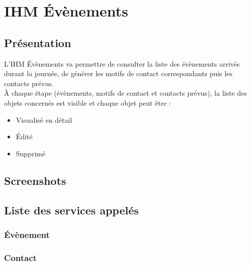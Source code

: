 \section{IHM Évènements}

\subsection{Présentation}

L'IHM Évènements va permettre de consulter la liste des évènements arrivés
durant la journée, de générer les motifs de contact correspondants puis les
contacts prévus.\\

À chaque étape (évènements, motifs de contact et contacts prévus), la liste
des objets concernés est visible et chaque objet peut être :
\begin{itemize}
\item Visualisé en détail
\item Édité
\item Supprimé
\end{itemize}

\subsection{Screenshots}

\subsection{Liste des services appelés}

\subsubsection{Évènement}
\begin{itemize}
\end{itemize}

\subsubsection{Contact}
\begin{itemize}
\end{itemize}
